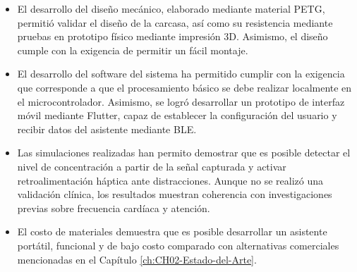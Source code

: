\begin{itemize}
    \item El desarrollo del diseño mecánico, elaborado mediante material PETG, permitió validar el diseño de la carcasa, así como su resistencia mediante pruebas en prototipo físico mediante impresión 3D. Asimismo, el diseño cumple con la exigencia de permitir un fácil montaje.
    
    \item El desarrollo del software del sistema ha permitido cumplir con la exigencia que corresponde a que el procesamiento básico se debe realizar localmente en el microcontrolador. Asimismo, se logró desarrollar un prototipo de interfaz móvil mediante Flutter, capaz de establecer la configuración del usuario y recibir datos del asistente mediante \ac{BLE}.
    \item Las simulaciones realizadas han permito demostrar que es posible detectar el nivel de concentración a partir de la señal capturada y activar retroalimentación háptica ante distracciones. Aunque no se realizó una validación clínica, los resultados muestran coherencia con investigaciones previas sobre frecuencia cardíaca y atención. 
    \item  El costo de materiales demuestra que es posible desarrollar un asistente portátil, funcional y de bajo costo comparado con alternativas comerciales mencionadas en el Capítulo \ref{ch:CH02-Estado-del-Arte}.
\end{itemize}

